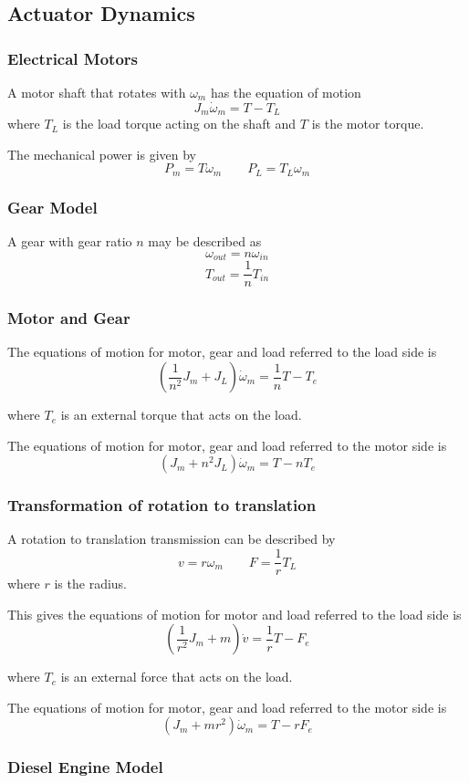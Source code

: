 \subsection{Actuator Dynamics}
\subsubsection{Electrical Motors}
A motor shaft that rotates with $\omega_m$ has the equation of motion
$$J_m\dot{\omega}_m=T-T_L$$ where $T_L$ is the load torque acting on the shaft and $T$ is the motor torque.

The mechanical power is given by
$$P_m = T\omega_m \qquad P_L = T_L\omega_m$$

\subsubsection{Gear Model}
A gear with gear ratio $n$ may be described as
$$\omega_{out}=n\omega_{in}$$
$$T_{out} = \frac{1}{n} T_{in}$$

\subsubsection{Motor and Gear}
The equations of motion for motor, gear and load referred to the load side is
$$(\frac{1}{n^2}J_m + J_L)\dot{\omega}_m = \frac{1}{n}T - T_e$$

where $T_e$ is an external torque that acts on the load. 

The equations of motion for motor, gear and load referred to the motor side is
$$(J_m + n^2J_L)\dot{\omega}_m = T - nT_e$$
\subsubsection{Transformation of rotation to translation}
A rotation to translation transmission can be described by 
$$v=r\omega_m
\qquad F=\frac{1}{r}T_L$$
where $r$ is the radius.

This gives the equations of motion for motor and load referred to the load side is
$$(\frac{1}{r^2}J_m + m)\dot{v} = \frac{1}{r}T - F_e$$

where $T_e$ is an external force that acts on the load. 

The equations of motion for motor, gear and load referred to the motor side is
$$(J_m + mr^2)\dot{\omega}_m = T - rF_e$$

\subsubsection{Diesel Engine Model}

